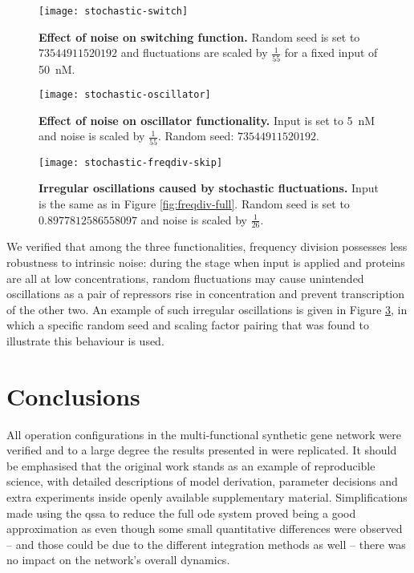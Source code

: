     \begin{figure}[!htb]
      \centering
      \texttt{[image: stochastic-switch]}
      \caption{\textbf{Effect of noise on switching function.} Random seed is set to $73544911520192$ and fluctuations are scaled by $\frac{1}{55}$ for a fixed input of \SI{50}{\nano M}.}
      \label{fig:stochastic-switch}
    \end{figure}

    \begin{figure}[!htb]
      \centering
      \texttt{[image: stochastic-oscillator]}
      \caption{\textbf{Effect of noise on oscillator functionality.} Input is set to \SI{5}{\nano M} and noise is scaled by $\frac{1}{55}$. Random seed: $73544911520192$.}
      \label{fig:stochastic-oscillator}
    \end{figure}

    \begin{figure}[!htb]
      \centering
      \texttt{[image: stochastic-freqdiv-skip]}
      \caption{\textbf{Irregular oscillations caused by stochastic fluctuations.} Input is the same as in Figure \ref{fig:freqdiv-full}. Random seed is set to $0.8977812586558097$ and noise is scaled by $\frac{1}{26}$.}
      \label{fig:stochastic-freqdiv-skip}
    \end{figure}

    We verified that among the three functionalities, frequency division possesses less robustness to intrinsic noise: during the stage when input is applied and proteins are all at low concentrations, random fluctuations may cause unintended oscillations as a pair of repressors rise in concentration and prevent transcription of the other two.
    An example of such irregular oscillations is given in Figure \ref{fig:stochastic-freqdiv-skip}, in which a specific random seed and scaling factor pairing that was found to illustrate this behaviour is used.


\section{Conclusions}

  All operation configurations in the multi-functional synthetic gene network were verified and to a large degree the results presented in \cite{multif} were replicated.
  It should be emphasised that the original work stands as an example of reproducible science, with detailed descriptions of model derivation, parameter decisions and extra experiments inside openly available supplementary material.
  Simplifications made using the \ac{qssa} to reduce the full \ac{ode} system proved being a good approximation as even though some small quantitative differences were observed -- and those could be due to the different integration methods as well -- there was no impact on the network's overall dynamics.

